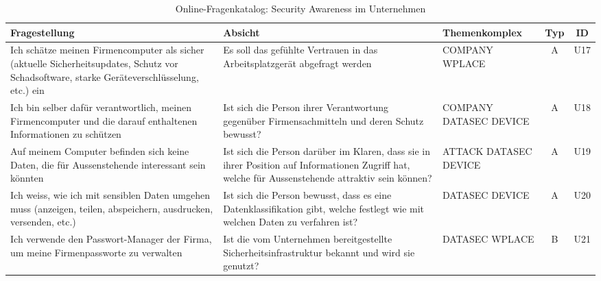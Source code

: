 \documentclass[../../main.tex]{subfiles}
\begin{document}

\sloppy 

\begin{table}[H]
\tablefontsize	
\centering
\caption{Online-Fragenkatalog: Security Awareness im Unternehmen}
\label{Security Awareness im Unternehmen}
\begin{tabular}{ |p{5.5cm}|p{5.5cm}|p{2.5cm}|c|c|}

\hline
\tableheaderbgcolor
\textbf{Fragestellung} & \textbf{Absicht} & \textbf{Themenkomplex} & \textbf{Typ} & \textbf{ID}\\ 
\hline
Ich schätze meinen Firmencomputer \newline als sicher (aktuelle Sicherheitsupdates, Schutz vor Schadsoftware, starke Geräteverschlüsselung, etc.) ein & Es soll das gefühlte Vertrauen in das Arbeitsplatzgerät abgefragt werden & COMPANY \newline WPLACE & A & U17 \\
\hline

Ich bin selber dafür verantwortlich, meinen Firmencomputer und die darauf enthaltenen Informationen zu schützen & Ist sich die Person ihrer Verantwortung gegenüber Firmensachmitteln und deren Schutz bewusst? & COMPANY \newline DATASEC \newline DEVICE & A & U18 \\
\hline

Auf meinem Computer befinden sich keine Daten, die für Aussenstehende interessant sein könnten & Ist sich die Person darüber im Klaren, dass sie in ihrer Position auf Informationen Zugriff hat, welche für Aussenstehende attraktiv sein können? & ATTACK \newline DATASEC \newline DEVICE & A & U19 \\
\hline

Ich weiss, wie ich mit sensiblen Daten umgehen muss (anzeigen, teilen, abspeichern, ausdrucken, versenden, etc.) & Ist sich die Person bewusst, dass es eine Datenklassifikation gibt, welche festlegt wie mit welchen Daten zu verfahren ist? & DATASEC \newline DEVICE & A & U20 \\
\hline

Ich verwende den Passwort-Manager der Firma, um meine Firmenpassworte zu verwalten & Ist die vom Unternehmen bereitgestellte Sicherheitsinfrastruktur bekannt und wird sie genutzt? & DATASEC \newline WPLACE & B & U21 \\
\hline


\end{tabular}
\end{table}
\end{document}
